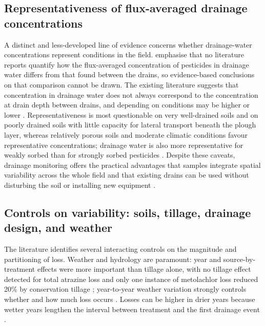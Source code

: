 \documentclass[11pt]{article}
\begin{document}
\subsection{Representativeness of flux-averaged drainage concentrations}
A distinct and less-developed line of evidence concerns whether drainage-water concentrations represent conditions in the field. \textcite{Jacobsen2007} emphasise that no literature reports quantify how the flux-averaged concentration of pesticides in drainage water differs from that found between the drains, so evidence-based conclusions on that comparison cannot be drawn. The existing literature suggests that concentration in drainage water does not always correspond to the concentration at drain depth between drains, and depending on conditions may be higher or lower \parencite{Jacobsen2007}. Representativeness is most questionable on very well-drained soils and on poorly drained soils with little capacity for lateral transport beneath the plough layer, whereas relatively porous soils and moderate climatic conditions favour representative concentrations; drainage water is also more representative for weakly sorbed than for strongly sorbed pesticides \parencite{Jacobsen2007}. Despite these caveats, drainage monitoring offers the practical advantages that samples integrate spatial variability across the whole field and that existing drains can be used without disturbing the soil or installing new equipment \parencite{Jacobsen2007}.

\subsection{Controls on variability: soils, tillage, drainage design, and weather}
The literature identifies several interacting controls on the magnitude and partitioning of loss. Weather and hydrology are paramount: year and source-by-treatment effects were more important than tillage alone, with no tillage effect detected for total atrazine loss and only one instance of metolachlor loss reduced 20\% by conservation tillage \parencite{GAYNOR1995}; year-to-year weather variation strongly controls whether and how much loss occurs \parencite{Kladivko2001}. Losses can be higher in drier years because wetter years lengthen the interval between treatment and the first drainage event \parencite{Dousset2004}.
\end{document}
